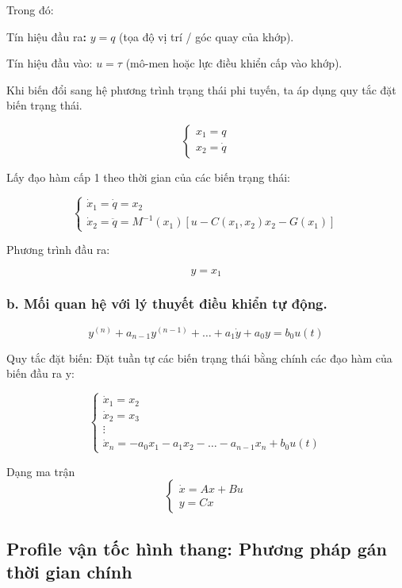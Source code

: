 \documentclass[12pt,a4paper,oneside]{report}
\begin{document}
Trong đó:

Tín hiệu đầu ra\textbf{:} \(y=q\) (tọa độ vị trí / góc quay của khớp).

Tín hiệu đầu vào: \(u=\tau \) (mô-men hoặc lực điều khiển cấp vào khớp).

Khi biến đổi sang hệ phương trình trạng thái phi tuyến, ta áp dụng quy tắc đặt biến trạng thái.

\[
\left\{ \begin{matrix}
x_{1}=q \\ x_{2}=\dot{q}
\end{matrix} \right.
\]

Lấy đạo hàm cấp 1 theo thời gian của các biến trạng thái:

\[
\left\{ \begin{matrix}
\dot{x}_{1}=\dot{q}=x_{2} \\ \dot{x}_{2}=\ddot{q}=M^{-1}\left( x_{1} \right)\left[ u-C\left( x_{1},x_{2} \right)x_{2}-G\left( x_{1} \right) \right]
\end{matrix} \right.
\]

Phương trình đầu ra:

\[
y=x_{1}
\]

\subsubsection*{b. Mối quan hệ với lý thuyết điều khiển tự động.}

\[
y^{\left( n \right)}+a_{n-1}y^{\left( n-1 \right)}+\dots +a_{1}\dot{y}+a_{0}y=b_{0}u\left( t \right)
\]

Quy tắc đặt biến: Đặt tuần tự các biến trạng thái bằng chính các đạo hàm của biến đầu ra y:

\[
\left\{ \begin{matrix}
\dot{x}_{1}=x_{2} \\ \dot{x}_{2}=x_{3} \\ \vdots  \\ \dot{x}_{n}=-a_{0}x_{1}-a_{1}x_{2}-\dots -a_{n-1}x_{n}+b_{0}u\left( t \right)
\end{matrix} \right.
\]

Dạng ma trận 
\[
\left\{ \begin{matrix}
\dot{x}=Ax+Bu \\ y=Cx
\end{matrix} \right.
\]

\subsection{Profile vận tốc hình thang: Phương pháp gán thời gian chính}
\end{document}
